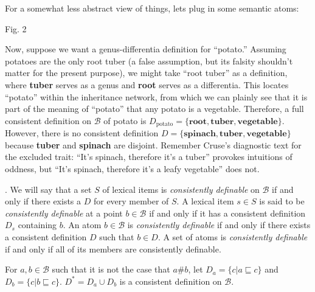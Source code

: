 \documentclass[12pt]{amsart}
\begin{document}
For a somewhat less abstract view of things, lets plug in some semantic atoms:
\par\vspace{5mm}
\centerline{
}
\centerline{Fig. 2}
Now, suppose we want a genus-differentia definition for ``potato.'' Assuming potatoes are the only root tuber (a false assumption, but its falsity shouldn't matter for the present purpose), we might take ``root tuber'' as a definition, where {\bf tuber} serves as a genus and {\bf root} serves as a differentia. This locates ``potato'' within the inheritance network, from which we can plainly see that it is part of the meaning of ``potato'' that any potato is a vegetable. Therefore, a full consistent definition on $\mathcal{B}$ of potato is $D_\text{potato}=\{\textbf{root},\textbf{tuber},\textbf{vegetable}\}$. However, there is no consistent definition $D=\{\textbf{spinach},\textbf{tuber},\textbf{vegetable}\}$ because {\bf tuber} and {\bf spinach} are disjoint. Remember Cruse's diagnostic text for the excluded trait: ``It's spinach, therefore it's a tuber'' provokes intuitions of oddness, but ``It's spinach, therefore it's a leafy vegetable'' does not.
\par\vspace{3mm}
. We will say that a set $S$ of lexical items is \emph{consistently definable} on $\mathcal{B}$ if and only if there exists a $D$ for every member of $S$. A lexical item $s\in S$ is said to be \emph{consistently definable} at a point $b\in\mathcal{B}$ if and only if it has a consistent definition $D_s$ containing $b$. An atom $b\in\mathcal{B}$ is \emph{consistently definable} if and only if there exists a consistent definition $D$ such that $b\in D$. A set of atoms is \emph{consistently definable} if and only if all of its members are consistently definable.
\par\vspace{3mm}
 For $a,b\in\mathcal{B}$ such that it is not the case that $a\#b$, let $D_a=\{c\vert a\sqsubseteq c\}$ and $D_b=\{c\vert b\sqsubseteq c\}$. $D^*=D_a\cup D_b$ is a consistent definition on $\mathcal{B}$.
\end{document}
